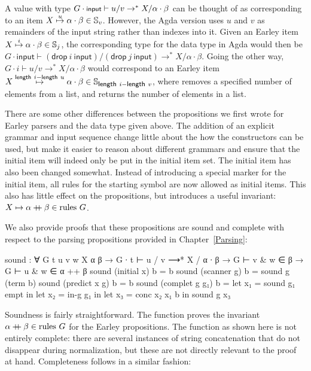 		A value with type $G \cdot \textsf{\footnotesize{}input} \vdash u / v \rightarrow^* X
		/ \alpha \cdot \beta$ can be thought of as corresponding to an item
		$X\overset{u}{\mapsto}\alpha\cdot\beta \in \mathbb{S}_v$. However, the Agda
		version uses $u$ and $v$ as remainders of the input string rather than
		indexes into it.  Given an Earley item {$X\overset{i}{\mapsto}\alpha\cdot\beta
		\in \mathbb{S}_j$, the corresponding type for the data type in Agda
		would then be $G \cdot \textsf{input} \vdash
		(\textsf{drop}~i~\textsf{input}) / (\textsf{drop}~j~\textsf{input})
		\rightarrow^* X / \alpha \cdot \beta$.  Going the other way, $G \cdot i
		\vdash u / v \rightarrow^* X / \alpha \cdot \beta$ would correspond to
		an Earley item $X\overset{\textsf{length}~i -
		\textsf{length}~u}{\mapsto}\alpha\cdot\beta \in \mathbb{S}_{\textsf{\footnotesize{}length}~i -
		\textsf{\footnotesize{}length}~v}$}, where  removes a specified number of
		elements from a list, and  returns the number of
		elements in a list.

		There are some other differences between the propositions we first
		wrote for Earley parsers and the data type given above. The addition of
		an explicit grammar and input sequence change little about the how the
		constructors can be used, but make it easier to reason about different
		grammars and ensure that the initial item will indeed only be put in
		the initial item set. The initial item has also been changed somewhat.
		Instead of introducing a special marker for the initial item, all rules
		for the starting symbol are now allowed as initial items.  This also
		has little effect on the propositions, but introduces a useful
		invariant: $X \mapsto \alpha \mathbin{{+}\mspace{-8mu}{+}} \beta \in \textrm{rules } G$.

		We also provide proofs that these propositions are sound and complete
		with respect to the parsing propositions provided in
		Chapter~\ref{Parsing}:

		\begin{code}
			sound : ∀ {G t u v w X α β} →
			  G ∙ t ⊢ u / v ⟶* X / α ∙ β →
			    G ⊢ v & w ∈ β →
			    G ⊢ u & w ∈ α ++ β
			sound (initial x) b = b
			sound (scanner g) b = sound g (term b)
			sound (predict x g) b = b
			sound (complet g g₁) b =
			  let x₁ = sound g₁ empt in
			  let x₂ = in-g g₁ in
			  let x₃ = conc x₂ x₁ b in
			  sound g x₃
		\end{code}

		Soundness is fairly straightforward. The  function proves
		the invariant $\alpha \mathbin{{+}\mspace{-8mu}{+}} \beta \in \textrm{rules } G$ for the
		Earley propositions. The function as shown here is not entirely
		complete: there are several instances of string concatenation that do
		not disappear during normalization, but these are not directly relevant
		to the proof at hand. Completeness follows in a similar fashion:

